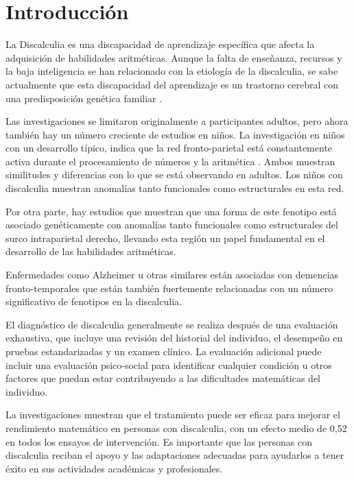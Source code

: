 \section{Introducción}

La Discalculia es una discapacidad de aprendizaje específica que afecta la adquisición de habilidades aritméticas. Aunque la falta de  enseñanza, recursos y la baja inteligencia se han relacionado con la etiología de la discalculia, se sabe actualmente que esta discapacidad del aprendizaje es un trastorno cerebral con una predisposición genética familiar \cite{Molko2003}.

\hfill

Las investigaciones se limitaron originalmente a participantes adultos, pero ahora también hay un número creciente de estudios en niños. La investigación en niños con un desarrollo típico, indica que la red fronto-parietal está constantemente activa durante el procesamiento de números y la aritmética \cite{originDis}. Ambos muestran similitudes y diferencias con lo que se está observando en adultos. Los niños con discalculia muestran anomalías tanto funcionales como estructurales en esta red.

\hfill


Por otra parte, hay estudios \cite{Molko2003,Shalev2001} que muestran que una forma de este fenotipo está asociado genéticamente con anomalías tanto funcionales como estructurales del surco intraparietal derecho, llevando esta región un papel fundamental en el desarrollo de las habilidades aritméticas.

\hfill

Enfermedades como Alzheimer u otras similares están asociadas con demencias fronto-temporales \cite{Walterfang2014} que están también fuertemente relacionadas con un número significativo de fenotipos en la discalculia.

\hfill

El diagnóstico de discalculia generalmente \cite{TreatmentDis} se realiza después de una evaluación exhaustiva, que incluye una revisión del historial del individuo, el desempeño en pruebas estandarizadas y un examen clínico. La evaluación adicional puede incluir una evaluación psico-social para identificar cualquier condición u otros factores que puedan estar contribuyendo a las dificultades matemáticas del individuo.

\hfill

La investigaciones muestran que el tratamiento puede ser eficaz para mejorar el rendimiento matemático en personas con discalculia, con un efecto medio de 0,52 \cite{TreatmentDis} en todos los ensayos de intervención. Es importante que las personas con discalculia reciban el apoyo y las adaptaciones adecuadas para ayudarlos a tener éxito en sus actividades académicas y profesionales.

